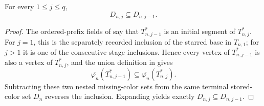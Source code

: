\begin{lemma}
For every $1\leq j\leq q$,
\[
 D_{n,j}\subseteq D_{n,j-1}.
\]
\end{lemma}
\begin{proof}
The ordered-prefix fields of  say that
$T_{n,j-1}^{*}$ is an initial segment of $T_{n,j}^{*}$.  For $j=1$,
this is the separately recorded inclusion of the starred base in
$T_{n,1}$; for $j>1$ it is one of the consecutive stage inclusions.
Hence every vertex of $T_{n,j-1}^{*}$ is also a vertex of
$T_{n,j}^{*}$, and the union definition in
 gives
\[
 \overline{\varphi_n}(T_{n,j-1}^{*})
 \subseteq
 \overline{\varphi_n}(T_{n,j}^{*}).
\]
Subtracting these two nested missing-color sets from the same terminal
stored-color set $D_n$ reverses the inclusion.  Expanding
 yields exactly
$D_{n,j}\subseteq D_{n,j-1}$.
\end{proof}
